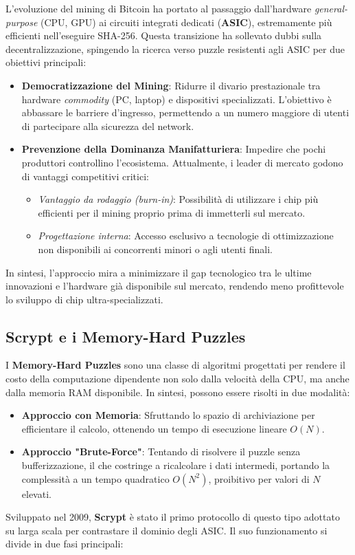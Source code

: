 L'evoluzione del mining di Bitcoin ha portato al passaggio dall'hardware \textit{general-purpose} (CPU, GPU) ai circuiti integrati dedicati (\textbf{ASIC}), estremamente più efficienti nell'eseguire SHA-256. Questa transizione ha sollevato dubbi sulla decentralizzazione, spingendo la ricerca verso puzzle resistenti agli ASIC per due obiettivi principali:

\begin{itemize}
    \item \textbf{Democratizzazione del Mining}: Ridurre il divario prestazionale tra hardware \textit{commodity} (PC, laptop) e dispositivi specializzati. L'obiettivo è abbassare le barriere d'ingresso, permettendo a un numero maggiore di utenti di partecipare alla sicurezza del network.
    
    \item \textbf{Prevenzione della Dominanza Manifatturiera}: Impedire che pochi produttori controllino l'ecosistema. Attualmente, i leader di mercato godono di vantaggi competitivi critici:
    \begin{itemize}
        \item \textit{Vantaggio da rodaggio (burn-in)}: Possibilità di utilizzare i chip più efficienti per il mining proprio prima di immetterli sul mercato.
        \item \textit{Progettazione interna}: Accesso esclusivo a tecnologie di ottimizzazione non disponibili ai concorrenti minori o agli utenti finali.
    \end{itemize}
\end{itemize}

In sintesi, l'approccio mira a minimizzare il gap tecnologico tra le ultime innovazioni e l'hardware già disponibile sul mercato, rendendo meno profittevole lo sviluppo di chip ultra-specializzati.

\subsection{Scrypt e i Memory-Hard Puzzles}
I \textbf{Memory-Hard Puzzles} sono una classe di algoritmi progettati per rendere il costo della computazione dipendente non solo dalla velocità della CPU, ma anche dalla memoria RAM disponibile. In sintesi, possono essere risolti in due modalità:
\begin{itemize}
    \item \textbf{Approccio con Memoria}: Sfruttando lo spazio di archiviazione per efficientare il calcolo, ottenendo un tempo di esecuzione lineare $O(N)$.
    \item \textbf{Approccio "Brute-Force"}: Tentando di risolvere il puzzle senza bufferizzazione, il che costringe a ricalcolare i dati intermedi, portando la complessità a un tempo quadratico $O(N^2)$, proibitivo per valori di $N$ elevati.
\end{itemize}
Sviluppato nel 2009, \textbf{Scrypt} è stato il primo protocollo di questo tipo adottato su larga scala per contrastare il dominio degli ASIC. Il suo funzionamento si divide in due fasi principali:
